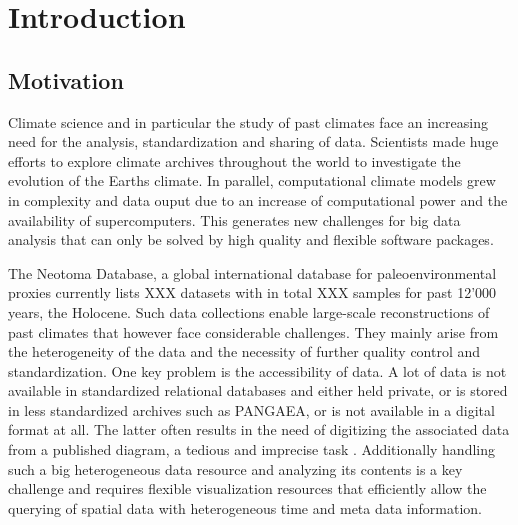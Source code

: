 
\chapter{Introduction}

\label{chp:intro}

\begin{refsection}


\section{Motivation} \label{sec:motivation}
Climate science and in particular the study of past climates face an increasing need for the analysis, standardization and sharing of data. Scientists made huge efforts to explore climate archives throughout the world to investigate the evolution of the Earths climate\addref. In parallel, computational climate models grew in complexity and data ouput due to an increase of computational power and the availability of supercomputers\addref. This generates new challenges for big data analysis that can only be solved by high quality and flexible software packages.

The Neotoma Database, a global international database for paleoenvironmental proxies \citep{WilliamsGrimmBloisEtAl2018} currently lists XXX datasets with in total XXX samples for past 12'000 years, the Holocene. Such data collections enable large-scale reconstructions of past climates that however face considerable challenges. They mainly arise from the heterogeneity of the data and the necessity of further quality control and standardization. One key problem is the accessibility of data. A lot of data is not available in standardized relational databases and either held private, or is stored in less standardized archives such as PANGAEA, or is not available in a digital format at all. The latter often results in the need of digitizing the associated data from a published diagram, a tedious and imprecise task \citep{SommerRechChevalierEtAl2019}. Additionally handling such a big heterogeneous data resource and analyzing its contents is a key challenge and requires flexible visualization resources that efficiently allow the querying of spatial data with heterogeneous time and meta data information.


\end{refsection}
